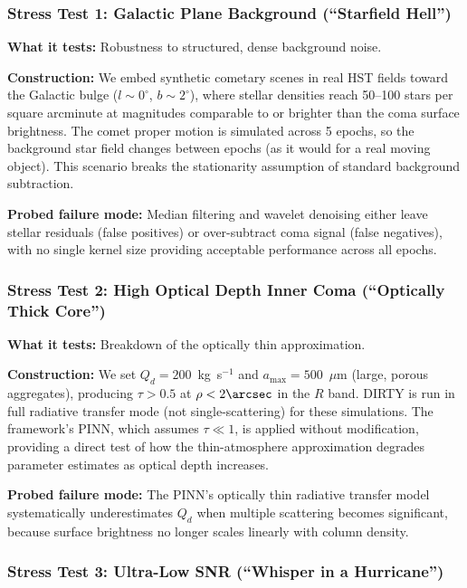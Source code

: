 \documentclass[preprint2]{aastex631}
\begin{document}
\subsubsection{Stress Test 1: Galactic Plane Background (``Starfield Hell'')}

\textbf{What it tests:} Robustness to structured, dense background noise.

\textbf{Construction:} We embed synthetic cometary scenes in real HST fields toward the Galactic bulge ($l \sim 0^\circ$, $b \sim 2^\circ$), where stellar densities reach 50--100 stars per square arcminute at magnitudes comparable to or brighter than the coma surface brightness. The comet proper motion is simulated across 5 epochs, so the background star field changes between epochs (as it would for a real moving object). This scenario breaks the stationarity assumption of standard background subtraction.

\textbf{Probed failure mode:} Median filtering and wavelet denoising either leave stellar residuals (false positives) or over-subtract coma signal (false negatives), with no single kernel size providing acceptable performance across all epochs.

\subsubsection{Stress Test 2: High Optical Depth Inner Coma (``Optically Thick Core'')}

\textbf{What it tests:} Breakdown of the optically thin approximation.

\textbf{Construction:} We set $Q_d = 200$~kg~s$^{-1}$ and $a_{\max} = 500$~$\mu$m (large, porous aggregates), producing $\tau > 0.5$ at $\rho < 2\arcsec$ in the $R$ band. DIRTY is run in full radiative transfer mode (not single-scattering) for these simulations. The framework's PINN, which assumes $\tau \ll 1$, is applied without modification, providing a direct test of how the thin-atmosphere approximation degrades parameter estimates as optical depth increases.

\textbf{Probed failure mode:} The PINN's optically thin radiative transfer model systematically underestimates $Q_d$ when multiple scattering becomes significant, because surface brightness no longer scales linearly with column density.

\subsubsection{Stress Test 3: Ultra-Low SNR (``Whisper in a Hurricane'')}
\end{document}
